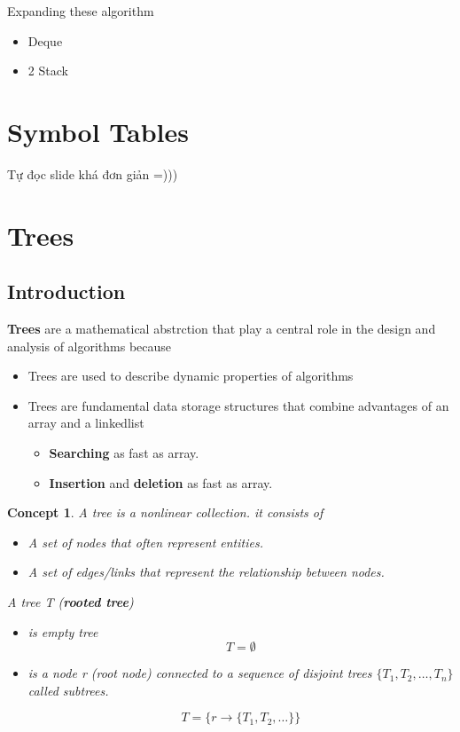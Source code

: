 \documentclass{article}
\newtheorem*{concept}{Concept}
\begin{document}
Expanding these algorithm 
\begin{itemize}
    \item Deque
    \item 2 Stack
\end{itemize}

\section{Symbol Tables}
Tự đọc slide khá đơn giản =)))

\section{Trees}

\subsection{Introduction}
\textbf{Trees} are a mathematical abstrction that play a central role in the design and analysis of algorithms because 
\begin{itemize}
    \item Trees are used to describe dynamic properties of algorithms
    \item Trees are fundamental data storage structures that combine advantages of an array and a linkedlist
        \begin{itemize}
            \item \textbf{Searching} as fast as array.
            \item \textbf{Insertion} and \textbf{deletion} as fast as array.
        \end{itemize}
\end{itemize}

\begin{concept}\:


    A tree is a nonlinear collection. it consists of 
    \begin{itemize}
        \item A set of nodes that often represent entities.
        \item A set of edges/links that represent the relationship between nodes.
    \end{itemize}
    
    A tree T (\textbf{rooted tree})
\begin{itemize}
    \item is empty tree
    $$T = \emptyset$$
    
    \item is a node r (root node) connected to a sequence of disjoint trees $\{T_1, T_2, \dots, T_n\}$ called subtrees.
    
    $$T = \{ r \xrightarrow[]{} \{T_1, T_2, \dots \}\}$$
\end{itemize}
\end{concept}
\end{document}
